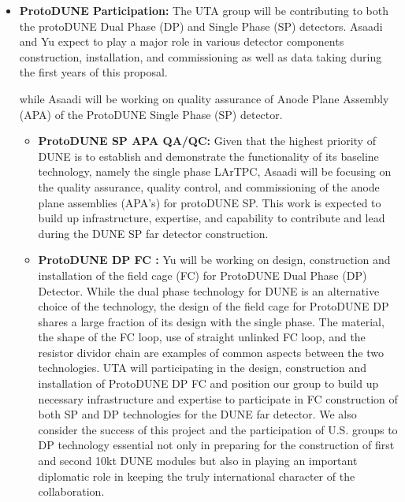 \begin{itemize}

\item {{\bf ProtoDUNE Participation:} The UTA group will be contributing to both the protoDUNE Dual Phase (DP) and Single Phase (SP) detectors. Asaadi and Yu expect to play a major role in various detector components construction, installation, and commissioning as well as data taking during the first years of this proposal.

 while Asaadi will be working on quality assurance of Anode Plane Assembly (APA) of the ProtoDUNE Single Phase (SP) detector.}
 
\begin{itemize}
\item {{\bf ProtoDUNE SP APA QA/QC:} Given that the highest priority of DUNE is to establish and demonstrate the functionality of its baseline technology, namely the single phase LArTPC, Asaadi will be focusing on the quality assurance, quality control, and commissioning of the anode plane assemblies (APA's) for protoDUNE SP. This work is expected to build up infrastructure, expertise, and capability to contribute and lead during the DUNE SP far detector construction.}

\item {{\bf ProtoDUNE DP FC :} Yu will be working on design, construction and installation of the field cage (FC) for ProtoDUNE Dual Phase (DP) Detector. While the dual phase technology for DUNE is an alternative choice of the technology, the design of the field cage for ProtoDUNE DP shares a large fraction of its design with the single phase. The material, the shape of the FC loop, use of straight unlinked FC loop, and the resistor dividor chain are examples of common aspects between the two technologies.  UTA will participating in the design, construction and installation of ProtoDUNE DP FC and position our group to build up necessary infrastructure and expertise to participate in FC construction of both SP and DP technologies for the DUNE far detector.  We also consider the success of this project and the participation of U.S. groups to DP technology essential not only in preparing for the construction of first and second 10kt DUNE modules but also in playing an important diplomatic role in keeping the truly international character of the collaboration.}

\end{itemize}


\end{itemize}
